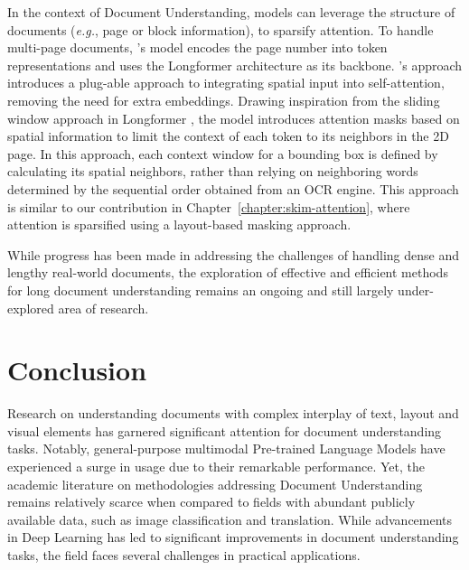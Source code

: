 In the context of Document Understanding, models can leverage the structure of documents (\textit{e.g.}, page or block information), to sparsify attention. To handle multi-page documents, \citet{pramanik2020towards}'s model encodes the page number into token representations and uses the Longformer architecture as its backbone. \citet{pham2022understanding}'s approach introduces a plug-able approach to integrating spatial input into self-attention, removing the need for extra embeddings. Drawing inspiration from the sliding window approach in Longformer \citep{beltagy2020longformer}, the model introduces attention masks based on spatial information to limit the context of each token to its neighbors in the 2D page. In this approach, each context window for a bounding box is defined by calculating its spatial neighbors, rather than relying on neighboring words determined by the sequential order obtained from an \ac{OCR} engine. This approach is similar to our contribution in Chapter~\ref{chapter:skim-attention}, where attention is sparsified using a layout-based masking approach.

While progress has been made in addressing the challenges of handling dense and lengthy real-world documents, the exploration of effective and efficient methods for long document understanding remains an ongoing and still largely under-explored area of research. 


\section{Conclusion}

Research on understanding documents with complex interplay of text, layout and visual elements has garnered significant attention for document understanding tasks. Notably, general-purpose multimodal Pre-trained Language Models have experienced a surge in usage due to their remarkable performance. Yet, the academic literature on methodologies addressing Document Understanding remains relatively scarce when compared to fields with abundant publicly available data, such as image classification and translation. While advancements in Deep Learning has led to significant improvements in document understanding tasks, the field faces several challenges in practical applications. 

